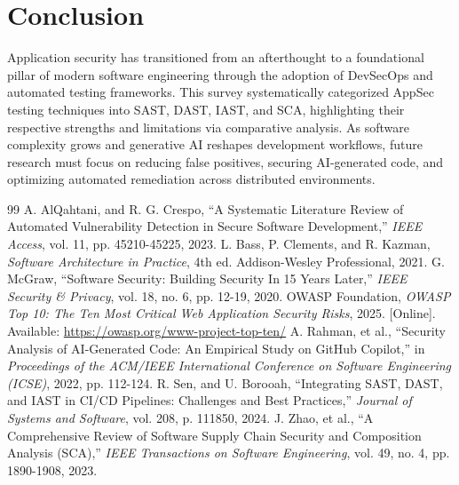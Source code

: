 \documentclass[11pt,a4paper]{article}
\begin{document}
\section{Conclusion}
Application security has transitioned from an afterthought to a foundational pillar of modern software engineering through the adoption of DevSecOps and automated testing frameworks. This survey systematically categorized AppSec testing techniques into SAST, DAST, IAST, and SCA, highlighting their respective strengths and limitations via comparative analysis. As software complexity grows and generative AI reshapes development workflows, future research must focus on reducing false positives, securing AI-generated code, and optimizing automated remediation across distributed environments.

\begin{thebibliography}{99}
 A. AlQahtani, and R. G. Crespo, ``A Systematic Literature Review of Automated Vulnerability Detection in Secure Software Development,'' \emph{IEEE Access}, vol. 11, pp. 45210-45225, 2023.
 L. Bass, P. Clements, and R. Kazman, \emph{Software Architecture in Practice}, 4th ed. Addison-Wesley Professional, 2021.
 G. McGraw, ``Software Security: Building Security In 15 Years Later,'' \emph{IEEE Security \& Privacy}, vol. 18, no. 6, pp. 12-19, 2020.
 OWASP Foundation, \emph{OWASP Top 10: The Ten Most Critical Web Application Security Risks}, 2025. [Online]. Available: \url{https://owasp.org/www-project-top-ten/}
 A. Rahman, et al., ``Security Analysis of AI-Generated Code: An Empirical Study on GitHub Copilot,'' in \emph{Proceedings of the ACM/IEEE International Conference on Software Engineering (ICSE)}, 2022, pp. 112-124.
 R. Sen, and U. Borooah, ``Integrating SAST, DAST, and IAST in CI/CD Pipelines: Challenges and Best Practices,'' \emph{Journal of Systems and Software}, vol. 208, p. 111850, 2024.
 J. Zhao, et al., ``A Comprehensive Review of Software Supply Chain Security and Composition Analysis (SCA),'' \emph{IEEE Transactions on Software Engineering}, vol. 49, no. 4, pp. 1890-1908, 2023.
\end{thebibliography}
\end{document}
